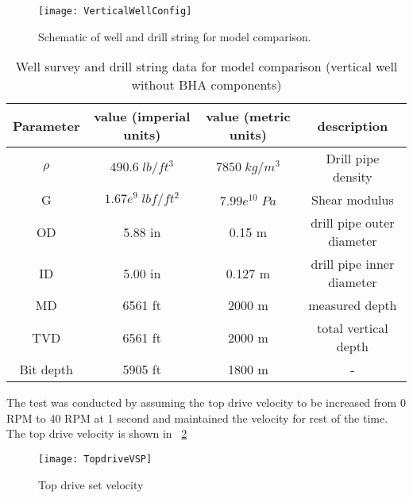 \begin{figure}[!hbt]
  \centering
  \texttt{[image: VerticalWellConfig]}
  \caption[Schematic of well and drill string for model comparison.]{Schematic of well and drill string for model comparison.}\label{figure_verticalwell}
\end{figure}

\begin{table}[!hbt]
\centering
\begin{tabular}{|c|c|c|c|}
\hline
Parameter & value (imperial units) & value (metric units) & description\\                                                              
\hline
$\rho$ & $490.6\;lb/ft^3$ & $7850\;kg/m^3$ & Drill pipe density \\                                                  
\hline
G & $1.67e^9\;lbf/ft^2$ & $7.99e^{10}\;Pa$  & Shear modulus \\                                                  
\hline
OD & 5.88 in & 0.15 m & drill pipe outer diameter\\                                                       
\hline
ID & 5.00 in & 0.127 m & drill pipe inner diameter  \\                                                      
\hline
MD & 6561 ft & 2000 m & measured depth\\                                                              
\hline
TVD & 6561 ft & 2000 m & total vertical depth\\
\hline
Bit depth & 5905 ft & 1800 m & - \\ 
\hline
\end{tabular}
\caption[Well survey data for model comparison (vertical well)]{Well survey and drill string data for model comparison (vertical well without BHA components)}\label{table_verticalwell_input}
\end{table}
The test was conducted by assuming the top drive velocity to be increased from 0 RPM to 40 RPM at 1 second and maintained the velocity for rest of the time. The top drive velocity is shown in \figurename~\ref{figure_topdrive_VSP}

\begin{figure}[!hbt]
  \centering
  \texttt{[image: TopdriveVSP]}
  \caption[Top drive set velocity]{Top drive set velocity}\label{figure_topdrive_VSP}
\end{figure}

